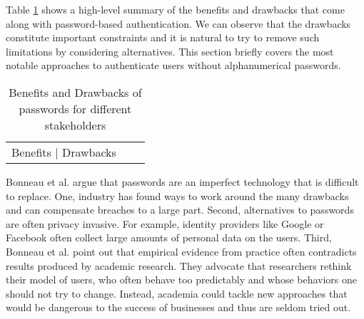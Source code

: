 Table \ref{table:rw:benefits_drawbacks_pws} shows a high-level summary of the benefits and drawbacks that come along with password-based authentication. We can observe that the drawbacks constitute important constraints and it is natural to try to remove such limitations by considering alternatives. This section briefly covers the most notable approaches to authenticate users without alphanumerical passwords.

\begin{table}
	\begin{tabular}{|l|l|l|}
		Benefits | Drawbacks 
	\end{tabular}
	\caption{\label{table:rw:benefits_drawbacks_pws}Benefits and Drawbacks of passwords for different stakeholders}
\end{table}




Bonneau et al. argue \cite{Bonneau2015ImperfectAuthentication} that passwords are an imperfect technology that is difficult to replace. One, industry has found ways to work around the many drawbacks and can compensate breaches to a large part. Second, alternatives to passwords are often privacy invasive. For example, identity providers like Google or Facebook often collect large amounts of personal data on the users. Third, Bonneau et al. point out that empirical evidence from practice often contradicts results produced by academic research. They advocate that researchers rethink their model of users, who often behave too predictably and whose behaviors one should not try to change. Instead, academia could tackle new approaches that would be dangerous to the success of businesses and thus are seldom tried out. 

